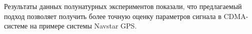 Результаты данных полунатурных экспериментов показали, что предлагаемый подход позволяет получить более точную оценку параметров
сигнала в CDMA-системе на примере системы Navstar GPS.

%
%
%
%
%
